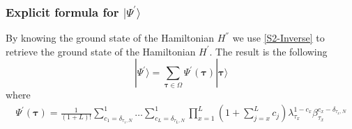 \documentclass[10pt]{article}
\numberwithin{equation}{section}
\numberwithin{equation}{subsection}
\newcommand{\dt}{\;.}
\begin{document}
\subsubsection{Explicit formula for $|\Psi^{'}\rangle$}\label{subsectionSSdual}
By knowing the ground state  of the Hamiltonian $H^{''}$ we use \eqref{S2-Inverse} to retrieve the ground state of the Hamiltonian $H^{'}$. The result is the following 
\begin{equation}\label{ABS-vect}
    |\Psi^{'}\rangle =\sum_{\bm{\tau}\in \Omega}\Psi^{'}(\bm{\tau})|\bm{\tau}\rangle 
\end{equation}
where  
\begin{equation}\label{ABS}
		\begin{split}
			\Psi^{'}(\bm{\tau})=\frac{1}{(1+L)!}\sum_{c_{1}=\delta_{\tau_{1},N}}^{1}\ldots\sum_{c_{L}=\delta_{\tau_{L},N}}^{1}\prod_{x=1}^{L}\left(1+\sum_{j=x}^{L}c_{j}\right)\lambda_{\tau_{x}}^{1-c_{x}}\beta_{\tau_{x}}^{c_{x}-\delta_{\tau_{x},N}}
		\end{split}
	\end{equation} 
\begin{comment}
{\color{blue}
	\begin{equation}
		\Psi^{'}(\bm{\tau})=\frac{1}{(1+L)!}\sum_{c_{1}=0}^{1-\delta_{\tau_{1},N}}\ldots\sum_{c_{L}=0}^{1-\delta_{\tau_{L},N}}\prod_{x=1}^{L}\lambda_{\tau_{x}}^{c_{x}}\left(2+L-x-\sum_{j=x}^{L}c_{j}\right)\beta_{\tau_{x}}^{(1-c_{x}-\delta_{\tau_{x},N})}
	\end{equation}
\begin{equation}
	\Psi^{'}(\bm{\tau})=\sum_{c_{1}=0}^{1-\delta_{\tau_{1},N}}\ldots\sum_{c_{L}=0}^{1-\delta_{\tau_{L},N}}\frac{\Gamma(2+L-\sum_{z=1}^{L}c_{z})}{\Gamma(L+2)}\prod_{x=1}^{L}\left(\lambda_{\tau_{x}}\left(2+L-x-\sum_{j=x}^{L}c_{j}\right)\right)^{c_{x}}\beta_{\tau_{x}}^{(1-c_{x})(1-\delta_{\tau_{x},N})}\dt
\end{equation}
	\begin{equation}
		\Psi^{'}(\bm{\tau})=\frac{1}{(1+L)!}\sum_{c_{1}=0}^{1-\delta_{\tau_{1},N}}\ldots\sum_{c_{L}=0}^{1-\delta_{\tau_{L},N}}\prod_{x=1}^{L}\left(\frac{\lambda_{\tau_{x}}}{\beta_{\tau_x}}\right)^{c_{x}}\left(2+L-x-\sum_{j=x}^{L}c_{j}\right)\beta_{\tau_{x}}^{1-\delta_{\tau_{x},N} }
	\end{equation}
}
\end{comment}
\end{document}
